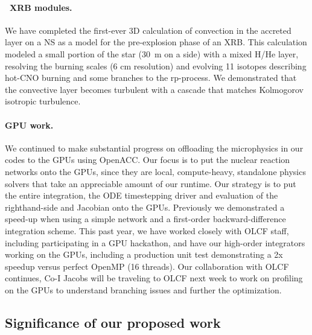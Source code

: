 \documentclass[11pt,letterpaper,english]{article}
\begin{document}
\paragraph{\maestro\ XRB modules.}
%
We have completed the first-ever 3D calculation of convection in the
accreted layer on a NS as a model for the pre-explosion
phase of an XRB.  This calculation modeled a small portion of the star
(30~m on a side) with a mixed H/He layer, resolving the burning scales
(6 cm resolution) and evolving 11 isotopes describing hot-CNO burning
and some branches to the rp-process.  We demonstrated that the
convective layer becomes turbulent with a cascade that matches
Kolmogorov isotropic turbulence.



\paragraph{GPU work.}
%
We continued to make substantial progress on offloading the
microphysics in our codes to the GPUs using OpenACC.  Our focus is to
put the nuclear reaction networks onto the GPUs, since they are local,
compute-heavy, standalone physics solvers that take an appreciable
amount of our runtime. Our strategy is to put the entire integration,
the ODE timestepping driver and evaluation of the righthand-side and
Jacobian onto the GPUs.  Previously we demonstrated a speed-up when
using a simple network and a first-order backward-difference
integration scheme.  This past year, we have worked closely with OLCF
staff, including participating in a GPU hackathon, and have our
high-order integrators working on the GPUs, including a production unit test
demonstrating a 2x speedup versus perfect OpenMP (16 threads).  Our collaboration
with OLCF continues, Co-I Jacobs will be traveling to OLCF next week
to work on profiling on the GPUs to understand branching issues and
further the optimization.

\subsection{Significance of our proposed work}
\end{document}
